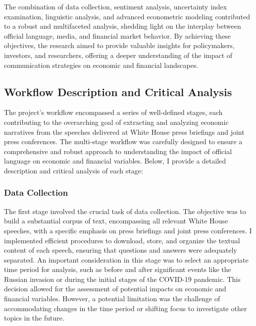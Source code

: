 \documentclass{article}
\begin{document}
The combination of data collection, sentiment analysis, uncertainty index examination, linguistic analysis, and advanced econometric modeling contributed to a robust and multifaceted analysis, shedding light on the interplay between official language, media, and financial market behavior. By achieving these objectives, the research aimed to provide valuable insights for policymakers, investors, and researchers, offering a deeper understanding of the impact of communication strategies on economic and financial landscapes.

\subsection{Workflow Description and Critical Analysis}

The project's workflow encompassed a series of well-defined stages, each contributing to the overarching goal of extracting and analyzing economic narratives from the speeches delivered at White House press briefings and joint press conferences. The multi-stage workflow was carefully designed to ensure a comprehensive and robust approach to understanding the impact of official language on economic and financial variables. Below, I provide a detailed description and critical analysis of each stage:

\subsubsection{Data Collection}
The first stage involved the crucial task of data collection. The objective was to build a substantial corpus of text, encompassing all relevant White House speeches, with a specific emphasis on press briefings and joint press conferences. I implemented efficient procedures to download, store, and organize the textual content of each speech, ensuring that questions and answers were adequately separated. An important consideration in this stage was to select an appropriate time period for analysis, such as before and after significant events like the Russian invasion or during the initial stages of the COVID-19 pandemic. This decision allowed for the assessment of potential impacts on economic and financial variables. However, a potential limitation was the challenge of accommodating changes in the time period or shifting focus to investigate other topics in the future.
\end{document}
